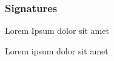 \begin{frame}
	\frametitle{Signatures}

	\begin{definition}
		Lorem Ipsum dolor sit amet
	\end{definition}
	\begin{definition}
		Lorem ipsum dolor sit amet
	\end{definition}
\end{frame}